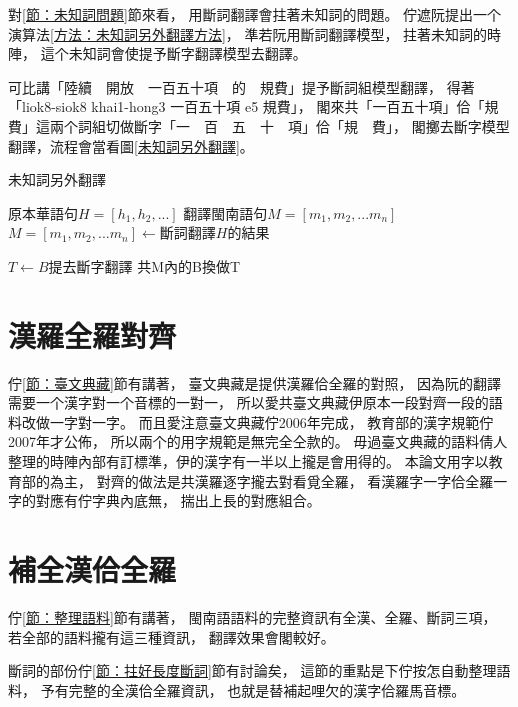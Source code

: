 對\ref{節：未知詞問題}節來看，
用斷詞翻譯會拄著未知詞的問題。
佇遮阮提出一个演算法\ref{方法：未知詞另外翻譯方法}，
準若阮用斷詞翻譯模型，
拄著未知詞的時陣，
這个未知詞會使提予斷字翻譯模型去翻譯。

可比講「陸續　開放　一百五十項　的　規費」提予斷詞組模型翻譯，
得著「liok8-siok8 khai1-hong3 一百五十項 e5 規費」，
閣來共「一百五十項」佮「規費」這兩个詞組切做斷字「一　百　五　十　項」佮「規　費」，
閣擲去斷字模型翻譯，流程會當看圖\ref{未知詞另外翻譯}。

\begin{algorithm}
  \caption{未知詞另外翻譯}
  \label{方法：未知詞另外翻譯方法}
  \begin{algorithmic}
    \REQUIRE \( 原本華語句H = [h_{1}, h_{2},...] \)
    \ENSURE \( 翻譯閩南語句M = [m_{1}, m_{2},...m_{n}] \)
    \STATE \( M = [m_{1}, m_{2},...m_{n}] \gets 斷詞翻譯H的結果 \)
    
		\STATE \( T \gets B提去斷字翻譯 \)
		\STATE 共M內的B換做T
	\ENDWHILE
  \end{algorithmic}
\end{algorithm}


\section{漢羅全羅對齊}
\label{節：漢羅全羅對齊}
佇\ref{節：臺文典藏}節有講著，
臺文典藏是提供漢羅佮全羅的對照，
因為阮的翻譯需要一个漢字對一个音標的一對一，
所以愛共臺文典藏伊原本一段對齊一段的語料改做一字對一字。
而且愛注意臺文典藏佇2006年完成，
教育部的漢字規範佇2007年才公佈，
所以兩个的用字規範是無完全仝款的。
毋過臺文典藏的語料倩人整理的時陣內部有訂標準，伊的漢字有一半以上攏是會用得的。
本論文用字以教育部的為主，
對齊的做法是共漢羅逐字攏去對看覓全羅，
看漢羅字一字佮全羅一字的對應有佇字典內底無，
揣出上長的對應組合。


\section{補全漢佮全羅}
\label{節：補全漢佮全羅}
佇\ref{節：整理語料}節有講著，
閩南語語料的完整資訊有全漢、全羅、斷詞三項，
若全部的語料攏有這三種資訊，
翻譯效果會閣較好。

斷詞的部份佇\ref{節：拄好長度斷詞}節有討論矣，
這節的重點是下佇按怎自動整理語料，
予有完整的全漢佮全羅資訊，
也就是替補起哩欠的漢字佮羅馬音標。

